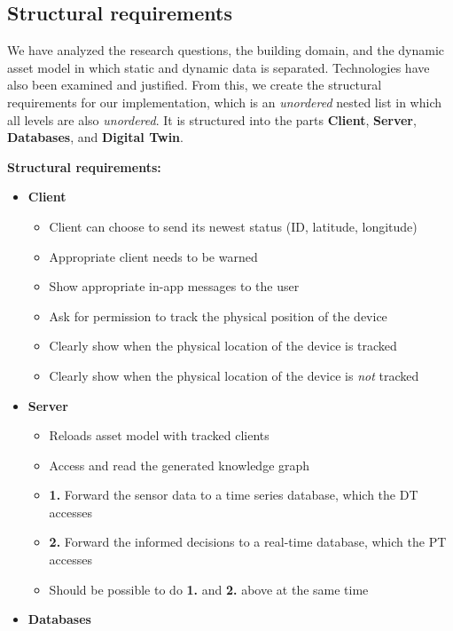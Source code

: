 \documentclass{article}
\begin{document}
\subsection{Structural requirements}\label{subsec:Requirements}
We have analyzed the research questions, the building domain, and the dynamic asset model in which static and dynamic data is separated. Technologies have also been examined and justified. From this, we create the structural requirements for our implementation, which is an \emph{unordered} nested list in which all levels are also \emph{unordered}. It is structured into the parts \textbf{Client}, \textbf{Server}, \textbf{Databases}, and \textbf{Digital Twin}.
\newline

\noindent\textbf{Structural requirements:}
\begin{itemize}
    \item \textbf{Client}
    \begin{itemize}
        \item Client can choose to send its newest status (ID, latitude, longitude) 
        \item Appropriate client needs to be warned 
        \item Show appropriate in-app messages to the user
        \item Ask for permission to track the physical position of the device
        \item Clearly show when the physical location of the device is tracked
        \item Clearly show when the physical location of the device is \emph{not} tracked
    \end{itemize}
    \item \textbf{Server}
    \begin{itemize}
        \item Reloads asset model with tracked clients
        \item Access and read the generated knowledge graph
        \item \textbf{1.} Forward the sensor data to a time series database, which the DT accesses
        \item \textbf{2.} Forward the informed decisions to a real-time database, which the PT accesses
        \item Should be possible to do \textbf{1.} and \textbf{2.} above at the same time
    \end{itemize}
    \item \textbf{Databases}

\end{itemize}
\end{document}
